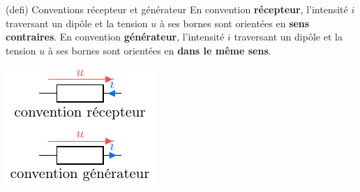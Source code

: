 \documentclass[../../main/main.tex]{subfiles}
\begin{document}
% 

\begin{tcb}[label=def:convrg, sidebyside, righthand width=.3\linewidth](defi)
	{Conventions récepteur et générateur}
	En convention \textbf{récepteur}, l'intensité $i$ traversant un dipôle et la
	tension $u$ à ses bornes sont orientées en \textbf{sens contraires}.
	\bigbreak
	En convention \textbf{générateur}, l'intensité $i$ traversant un dipôle et la
	tension $u$ à ses bornes sont orientées en \textbf{dans le même sens}.
	\tcblower
	\begin{center}
		\includegraphics[width=\linewidth]{rgconv}
	\end{center}
\end{tcb}
\end{document}
